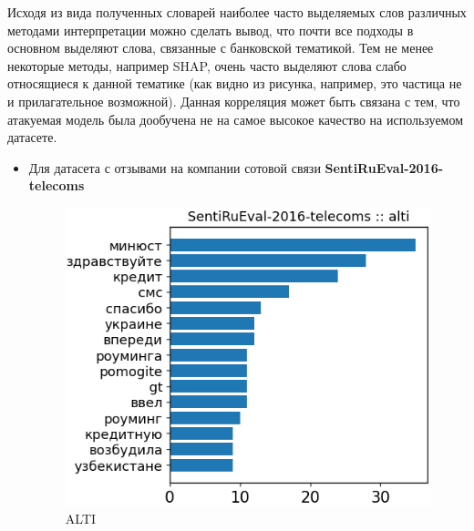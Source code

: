 \noindent\hspace{0.6cm}Исходя из вида полученных словарей наиболее часто выделяемых слов различных методами интерпретации можно сделать вывод, что почти все подходы в основном выделяют слова, связанные с банковской тематикой. Тем не менее некоторые методы, например SHAP, очень часто выделяют слова слабо относящиеся к данной тематике (как видно из рисунка, например, это частица не и прилагательное возможной). Данная корреляция может быть связана с тем, что атакуемая модель была дообучена не на самое высокое качество на используемом датасете.

\newpage
\begin{itemize}
\item Для датасета с отзывами на компании сотовой связи \textbf{SentiRuEval-2016-telecoms}

\begin{figure}[H]
\centering
\begin{minipage}[b]{0.49\textwidth}
\centering
\includegraphics[width=\textwidth]{pictures/examples_telecoms/dct1.png} %
\caption{ALTI}
\end{minipage}
\hfill
\begin{minipage}[b]{0.49\textwidth}
\centering

\end{minipage}
\end{figure}
\end{itemize}
